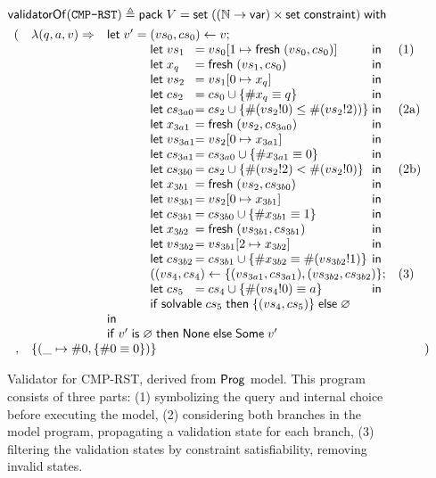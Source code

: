 \begin{figure}[h]
\begin{align*}
&\validatorOf(\texttt{CMP-RST})\triangleq\existT{V}{\Set((\Nat\to\Var)\times\Set\constraint)}\\
  &\begin{array}{rll}
     (&\lam{(q,a,v)}{&\llet v'=\begin{array}[t]{@{}l@{}l@{}ll}
       \multicolumn{3}{@{}l}{(vs_0,cs_0)\gets v;}\\
       \letin{vs_1&}{\update{vs_0}{1}{\Fresh (vs_0,cs_0)}&}&\text{(1)}\\
       \letin{x_q&}{\Fresh (vs_1,cs_0)&}\\
       \letin{vs_2&}{\update{vs_1}{0}{x_q}&}\\
       \letin{cs_2&}{cs_0\cup\{\#x_q\equiv q\}&}\\
       \letin{cs_{3a0}&}{cs_2\cup\{\#(vs_2!0)\le\#(vs_2!2))\}&}&\text{(2a)}\\
       \letin{x_{3a1}&}{\Fresh (vs_2,cs_{3a0})&}\\
       \letin{vs_{3a1}&}{\update{vs_2}{0}{x_{3a1}}&}\\
       \letin{cs_{3a1}&}{cs_{3a0}\cup\{\#x_{3a1}\equiv0\}&}\\
       \letin{cs_{3b0}&}{cs_2\cup\{\#(vs_2!2)<\#(vs_2!0)\}&}&\text{(2b)}\\
       \letin{x_{3b1}&}{\Fresh (vs_2,cs_{3b0})&}\\
       \letin{vs_{3b1}&}{\update{vs_2}{0}{x_{3b1}}&}\\
       \letin{cs_{3b1}&}{cs_{3b0}\cup\{\#x_{3b1}\equiv1\}&}\\
       \letin{x_{3b2}&}{\Fresh (vs_{3b1},cs_{3b1})&}\\
       \letin{vs_{3b2}&}{\update{vs_{3b1}}{2}{x_{3b2}}&}\\
       \letin{cs_{3b2}&}{cs_{3b1}\cup\{\#x_{3b2}\equiv\#(vs_{3b2}!1)\}&}\\
       \multicolumn{3}{@{}l}{((vs_4,cs_4)\gets\{(vs_{3a1},cs_{3a1}),(vs_{3b2},cs_{3b2})\};}&\text{(3)}\\
       \letin{cs_5&}{cs_4\cup\{\#(vs_4!0)\equiv a\}&}\\
       \multicolumn{3}{@{}l}{\If\solvable cs_5\Then\{(vs_4,cs_5)\}\Else\varnothing}\\
       \end{array}\\
       &&\iin\\
       &&\If v'\Is\varnothing\Then\None\Else\Some v'
     }\\
     ,&\multicolumn{2}{l}{\{(\_\mapsto\#0,\{\#0\equiv0\})\}})
   \end{array}
\end{align*}
\caption[Validator for protocol CMP-RST]{Validator for CMP-RST, derived from
  $\mathsf{Prog}$ model.  This program consists of three parts: (1) symbolizing the
  query and internal choice before executing the model, (2) considering both
  branches in the model program, propagating a validation state for each branch,
  (3) filtering the validation states by constraint satisfiability, removing
  invalid states.}
\label{fig:derived-validator}
\end{figure}

